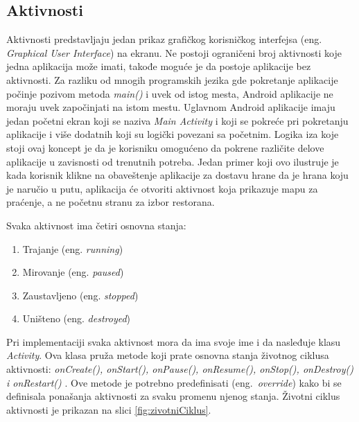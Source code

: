 \documentclass[android.tex]{subfiles}
\begin{document}
\subsection{Aktivnosti}
Aktivnosti predstavljaju jedan prikaz grafičkog korisničkog interfejsa (eng. \textit{Graphical User Interface}) na ekranu. Ne postoji ograničeni broj aktivnosti koje jedna aplikacija može imati, takođe moguće je da postoje aplikacije bez aktivnosti. Za razliku od mnogih programskih jezika gde pokretanje aplikacije počinje pozivom metoda \textit{main()} i uvek od istog mesta, Android aplikacije ne moraju uvek započinjati na istom mestu. Uglavnom Android aplikacije imaju jedan početni ekran koji se naziva \textit{Main Activity} i  koji se pokreće pri pokretanju aplikacije i više dodatnih koji su logički povezani sa početnim. Logika iza koje stoji ovaj koncept je da je korisniku omogućeno da pokrene različite delove aplikacije u zavisnosti od trenutnih potreba. Jedan primer koji ovo ilustruje je kada korisnik klikne na obaveštenje aplikacije za dostavu hrane da je hrana koju je naručio u putu, aplikacija će otvoriti aktivnost koja prikazuje mapu za praćenje, a ne početnu stranu za izbor restorana.

Svaka aktivnost ima četiri osnovna stanja: 
\begin{enumerate}
    \item Trajanje (eng. \textit{running})
    \item Mirovanje (eng. \textit{paused})
    \item Zaustavljeno (eng. \textit{stopped})
    \item Uništeno (eng. \textit{destroyed})
\end{enumerate}
Pri implementaciji svaka aktivnost mora da ima svoje ime i da nasleđuje klasu \textit{Activity}. Ova klasa pruža metode koji prate osnovna stanja životnog ciklusa aktivnosti: \textit{onCreate(), onStart(), onPause(), onResume(), onStop(), onDestroy() i onRestart()} \cite{book:and9cookbook}. Ove metode je potrebno predefinisati (eng.~\textit{override}) kako bi se definisala ponašanja aktivnosti za svaku promenu njenog stanja. Životni ciklus aktivnosti je prikazan na slici \ref{fig:zivotniCiklus}.
\end{document}
